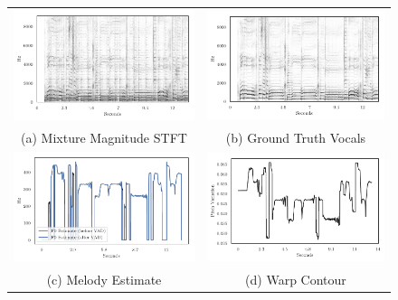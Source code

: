 \begin{figure}
\begin{tabular}{cc}
  \includegraphics[width=65mm]{Chapters/05_Separation_Known/warp-demo/Mixture.pdf} & \includegraphics[width=65mm]{Chapters/05_Separation_Known/warp-demo/reference.pdf} \\
(a) Mixture Magnitude STFT & (b) Ground Truth Vocals \\[6pt]
\includegraphics[width=65mm]{Chapters/05_Separation_Known/warp-demo/Melodia.pdf} & \includegraphics[width=65mm]{Chapters/05_Separation_Known/warp-demo/Contour.pdf} \\
(c) Melody Estimate & (d) Warp Contour \\[6pt]

\end{tabular}
\end{figure}
